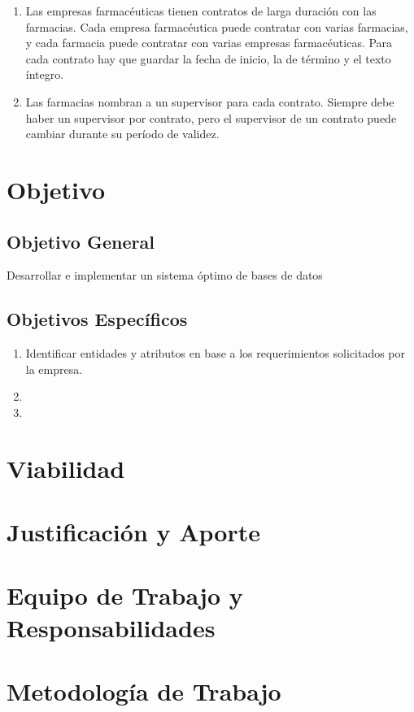 \documentclass[letter,12pt]{report}
\begin{document}
\begin{enumerate}
 \item  Las empresas farmacéuticas tienen contratos de larga duración con las farmacias. Cada empresa farmacéutica puede contratar con varias farmacias, y cada farmacia puede contratar con varias empresas farmacéuticas. Para cada contrato hay que guardar la fecha de inicio, la de término y el texto íntegro.
 \item Las farmacias nombran a un supervisor para cada contrato. Siempre debe haber un supervisor por contrato, pero el supervisor de un contrato puede cambiar durante su período de validez.
 \end{enumerate}


\section{Objetivo}

\subsection{Objetivo General}
Desarrollar e implementar un sistema óptimo de bases de datos
\subsection{Objetivos Específicos}
 \begin{enumerate}
     \item Identificar entidades y atributos en base a los requerimientos solicitados por la empresa.
     \item 
     \item
 \end{enumerate}
\section{Viabilidad}

\section{Justificación y Aporte}

\section{Equipo de Trabajo y Responsabilidades}

\section{Metodología de Trabajo}\label{sec:mettrabajo}
\end{document}
